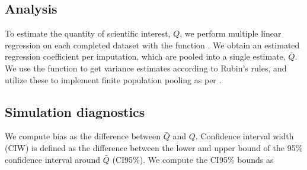 \documentclass[article]{jss}
\newcommand{\fct}[1]{\code{#1()}}
\begin{document}
% 
% 
% 


\subsection{Analysis}

To estimate the quantity of scientific interest, $Q$, we perform multiple linear regression on each completed dataset with the  function \fct{lm}. We obtain an estimated regression coefficient per imputation, which are pooled into a single estimate, $\bar{Q}$. We use the  function \fct{pool} to get variance estimates according to Rubin's \citeyear{rubin87} rules, and utilize these to implement finite population pooling as per \citep{vink14}.

\subsection{Simulation diagnostics}

We compute bias as the difference between $\bar{Q}$ and $Q$. Confidence interval width (CIW) is defined as the difference between the lower and upper bound of the 95\% confidence interval around $\bar{Q}$ (CI95\%). We compute the CI95\% bounds as 
\end{document}
